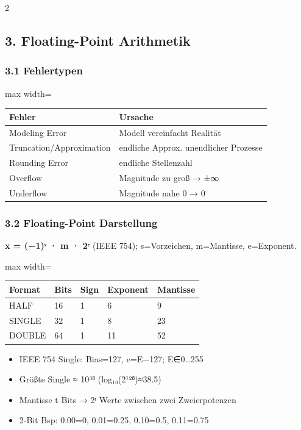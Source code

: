 \documentclass[10pt, a4paper]{article}
\begin{document}
\begin{multicols}{2}
\subsection{3. Floating-Point Arithmetik}


\subsubsection{3.1 Fehlertypen}

{\small
\begin{adjustbox}{max width=\linewidth}
{\scriptsize
\begin{tabular}{ll}
\toprule
\textbf{Fehler} & \textbf{Ursache} \\
\midrule
Modeling Error & Modell vereinfacht Realität \\
Truncation/Approximation & endliche Approx. unendlicher Prozesse \\
Rounding Error & endliche Stellenzahl \\
Overflow & Magnitude zu groß → ±∞ \\
Underflow & Magnitude nahe 0 → 0 \\
\bottomrule
\end{tabular}
}
\end{adjustbox}
}



\subsubsection{3.2 Floating-Point Darstellung}
\textbf{x = (−1)ˢ · m · 2ᵉ} (IEEE 754); s=Vorzeichen, m=Mantisse, e=Exponent.



{\small
\begin{adjustbox}{max width=\linewidth}
{\scriptsize
\begin{tabular}{lllll}
\toprule
\textbf{Format} & \textbf{Bits} & \textbf{Sign} & \textbf{Exponent} & \textbf{Mantisse} \\
\midrule
HALF & 16 & 1 & 6 & 9 \\
SINGLE & 32 & 1 & 8 & 23 \\
DOUBLE & 64 & 1 & 11 & 52 \\
\bottomrule
\end{tabular}
}
\end{adjustbox}
}


\begin{itemize}
  \item IEEE 754 Single: Bias=127, e=E−127; E∈0…255
  \item Größte Single ≈ 10³⁸ (log₁₀(2¹²⁸)≈38.5)
  \item Mantisse t Bits → 2ᵗ Werte zwischen zwei Zweierpotenzen
  \item 2-Bit Bsp: 0.00=0, 0.01=0.25, 0.10=0.5, 0.11=0.75
\end{itemize}


\end{multicols}
\end{document}
